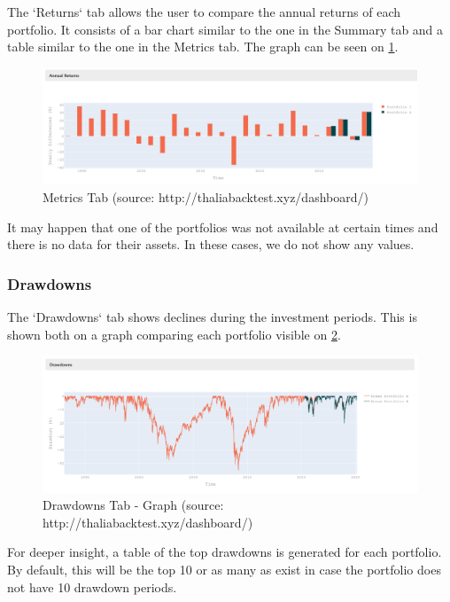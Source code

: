 \documentclass[main.tex]{subfiles}
\begin{document}
The `Returns` tab allows the user to compare the annual returns of each portfolio. It consists of a bar chart similar to the one in the Summary tab and a table similar to the one in the Metrics tab. The graph can be seen on \figurename{\ref{returns}}.

\begin{figure}[H]
   \centering
   \includegraphics[width=\textwidth]{08Appendices/081User/081Pictures/returns_graph.png}
   \caption{Metrics Tab (source: http://thaliabacktest.xyz/dashboard/)}
   \label{returns}
\end{figure}

It may happen that one of the portfolios was not available at certain times and there is no data for their assets. In these cases, we do not show any values. 

\subsubsection{Drawdowns}

The `Drawdowns` tab shows declines during the investment periods. This is shown both on a graph comparing each portfolio visible on \figurename{\ref{drawdowns_graph}}.

\begin{figure}[H]
   \centering
   \includegraphics[width=\textwidth]{08Appendices/081User/081Pictures/drawdowns_graph.png}
   \caption{Drawdowns Tab - Graph (source: http://thaliabacktest.xyz/dashboard/)}
   \label{drawdowns_graph}
\end{figure}

For deeper insight, a table of the top drawdowns is generated for each portfolio. By default, this will be the top 10 or as many as exist in case the portfolio does not have 10 drawdown periods.
\end{document}
